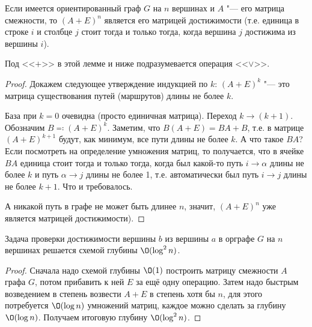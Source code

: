 	\begin{lemma}
		Если имеется ориентированный граф $G$ на $n$ вершинах и $A$ "--- его матрица смежности, то $(A+E)^n$ является его матрицей достижимости
		(т.е. единица в строке $i$ и столбце $j$ стоит тогда и только тогда, когда вершина $j$ достижима из вершины $i$).
	\end{lemma}
	\begin{Rem}
		Под <<$+$>> в этой лемме и ниже подразумевается операция <<$\lor$>>.
	\end{Rem}
	\begin{proof}
		Докажем следующее утверждение индукцией по $k$: $(A+E)^k$ "--- это матрица существования путей (маршрутов) длины не более $k$.

		База при $k=0$ очевидна (просто единичная матрица).
		Переход $k \to (k+1)$.
		Обозначим $B\eqcolon (A+E)^k$.
		Заметим, что $B(A+E)=BA+B$, т.е. в матрице $(A+E)^{k+1}$ будут, как минимум, все пути длины не более $k$.
		А что такое $BA$?
		Если посмотреть на определение умножения матриц, то получается, что в ячейке $BA$ единица стоит тогда и только тогда,
		когда был какой-то путь $i \to \alpha$ длины не более $k$ и путь $\alpha \to j$ длины не более 1, т.е.
		автоматически был путь $i \to j$ длины не более $k+1$.
		Что и требовалось.

		А никакой путь в графе не может быть длинее $n$, значит, $(A+E)^n$ уже является матрицей достижимости).
	\end{proof}

	\begin{theorem}
		Задача проверки достижимости вершины $b$ из вершины $a$ в орграфе $G$ на $n$ вершинах решается схемой глубины $\O(\log^2 n)$.
	\end{theorem}
	\begin{proof}
		Сначала надо схемой глубины $\O(1)$ построить матрицу смежности $A$ графа $G$, потом прибавить к ней $E$ за ещё одну операцию.
		Затем надо быстрым возведением в степень возвести $A+E$ в степень хотя бы $n$, для этого потребуется $\O(\log n)$ умножений матриц,
		каждое можно сделать за глубину $\O(\log n)$.
		Получаем итоговую глубину $\O(\log^2 n)$.
	\end{proof}
